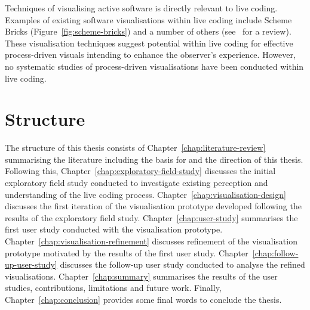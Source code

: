 Techniques of visualising active software is directly relevant to live coding. Examples of existing software visualisations within live coding include Scheme Bricks (Figure~\ref{fig:scheme-bricks}) and a number of others (see~\cite{McLean2010a} for a review). These visualisation techniques suggest potential within live coding for effective process-driven visuals intending to enhance the observer's experience. However, no systematic studies of process-driven visualisations have been conducted within live coding.


\section{Structure}

The structure of this thesis consists of Chapter~\ref{chap:literature-review} summarising the literature including the basis for and the direction of this thesis. Following this, Chapter~\ref{chap:exploratory-field-study} discusses the initial exploratory field study conducted to investigate existing perception and understanding of the live coding process. Chapter~\ref{chap:visualisation-design} discusses the first iteration of the visualisation prototype developed following the results of the exploratory field study. Chapter~\ref{chap:user-study} summarises the first user study conducted with the visualisation prototype. Chapter~\ref{chap:visualisation-refinement} discusses refinement of the visualisation prototype motivated by the results of the first user study. Chapter~\ref{chap:follow-up-user-study} discusses the follow-up user study conducted to analyse the refined visualisations. Chapter~\ref{chap:summary} summarises the results of the user studies, contributions, limitations and future work. Finally, Chapter~\ref{chap:conclusion} provides some final words to conclude the thesis.

